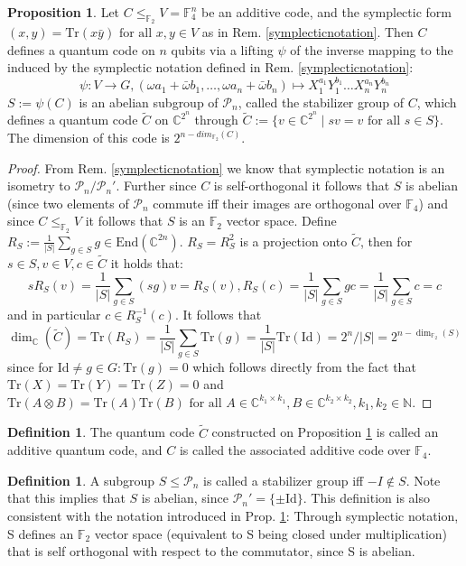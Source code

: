 \documentclass[12pt,a4paper,BCOR15mm,twoside,DIV12]{article}
\def\P{\mathcal{P}}
\def\N{\mathbb{N}}
\def\F{\mathbb{F}}
\def\C{\mathbb{C}}
\def\End{\text{End}}
\def\fa{\text{ for all }}
\def\Tr{\text{Tr}}
\def\Id{\text{Id}}
\theoremstyle{definition}
\newtheorem{prop}[Satz]{Proposition}
\newtheorem{defn}[Satz]{Definition}
\begin{document}
\begin{prop}\label{dimensioncode}
Let $C \leq_{\F_2} V = \F_4^n$ be an additive code, and the symplectic form $(x,y) = \Tr(x \bar y) \fa x,y \in V$ as in Rem. \ref{symplecticnotation}. Then $C$ defines a quantum code on $n$ qubits via a lifting $\psi$ of the inverse mapping to the induced by the symplectic notation defined in Rem. \ref{symplecticnotation}:
\[ \psi: V \rightarrow G, (\omega a_1 + \bar \omega b_1, \ldots, \omega a_n + \bar \omega b_n) \mapsto X_1^{a_1}Y_1^{b_1} \ldots X_n^{a_n}Y_n^{b_n} \]
$S:= \psi(C)$ is an abelian subgroup of $\P_n$, called the stabilizer group of $C$, which defines a quantum code $\tilde C$ on $\C^{2^n}$ through $\tilde C := \{ v \in \C^{2^n} \mid sv = v \fa s \in S \}$. The dimension of this code is $2^{n-dim_{\F_2}(C)}$.
\begin{proof}
From Rem. \ref{symplecticnotation} we know that symplectic notation is an isometry to $\P_n / \P_n'$. Further since $C$ is self-orthogonal it follows that $S$ is abelian (since two elements of $\P_n$ commute iff their images are orthogonal over $\F_4$) and since $C \leq_{\F_2} V$ it follows that $S$ is an $\F_2$ vector space.
Define $R_S:= \frac{1}{|S|} \sum_{g \in S} g \in \End(\C^{2n})$. $R_S = R_S^2$ is a projection onto $\tilde C$, then for $s \in S, v \in V, c \in \tilde C$ it holds that:   \[ s R_S(v) = \frac{1}{|S|}  \sum_{g \in S} (sg) v = R_S(v),  R_S(c) = \frac{1}{|S|} \sum_{g \in S} gc = \frac{1}{|S|} \sum_{g \in S} c = c \]
and in particular $c \in R_S^{-1}(c)$. It follows that \[ \dim_\C(\tilde C) = \Tr(R_S) = \frac{1}{|S|} \sum_{g \in S} \Tr(g) = \frac{1}{|S|} \Tr(\Id) = 2^n/|S| = 2^{n-\dim_{\F_2}(S)} \] since for $\Id \neq g \in G: \Tr(g) = 0 $ which follows directly from the fact that $\Tr(X) = \Tr(Y) = \Tr(Z) = 0$ and $\Tr(A \otimes B)= \Tr(A) \Tr(B) \fa A \in \C^{k_1 \times k_1}, B \in \C^{k_2 \times k_2}, k_1, k_2 \in \N$.
\end{proof}
\end{prop}

\begin{defn}
The quantum code $\tilde C$ constructed on Proposition \ref{dimensioncode} is called an additive quantum code, and $C$ is called the associated additive code over $\F_4$.
\end{defn}

\begin{defn}
A subgroup $S \leq \mathcal{P}_n$  is called a stabilizer group iff $-I \notin S$. Note that this implies that $S$ is abelian, since $\P_n' = \{ \pm \Id \}$. This definition is also consistent with the notation introduced in Prop. \ref{dimensioncode}: Through symplectic notation, S defines an $\F_2$ vector space (equivalent to S being closed under multiplication) that is self orthogonal with respect to the commutator, since S is abelian.
\end{defn}
\end{document}

